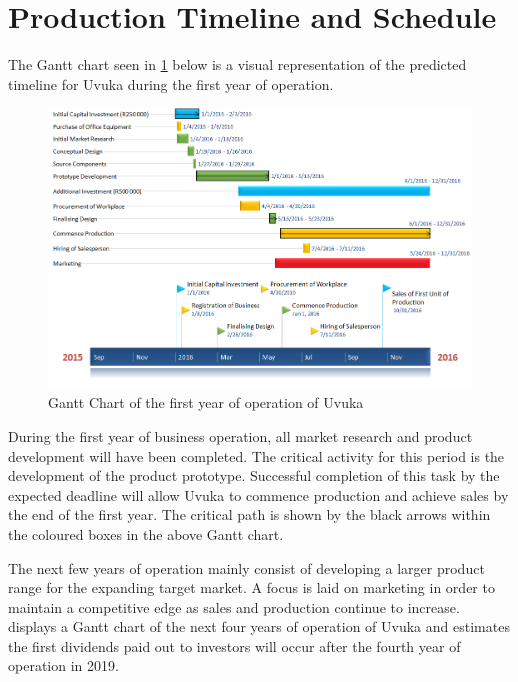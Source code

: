 \section{Production Timeline and Schedule}
The Gantt chart seen in  \cref{fig:Gantt Chart 1} below is a visual representation of the predicted timeline for Uvuka during the first year of operation. 
\begin{figure}[H]
\centering
\includegraphics[width=1\textwidth]{Gantt.PNG}
\vskip10pt
\caption[Gantt Chart of the first year of operation of Uvuka]{Gantt Chart of the first year of operation of Uvuka}
\label{fig:Gantt Chart 1}
\end{figure}

During the first year of business operation, all market research and product development will have been completed. The critical activity for this period is the development of the product prototype. Successful completion of this task by the expected deadline will allow Uvuka to commence production and achieve sales by the end of the first year. The critical path is shown by the black arrows within the coloured boxes in the above Gantt chart.

The next few years of operation mainly consist of developing a larger product range for the expanding target market. A focus is laid on marketing in order to maintain a competitive edge as sales and production continue to increase.  displays a Gantt chart of the next four years of operation of Uvuka and estimates the first dividends paid out to investors will occur after the fourth year of operation in 2019.

